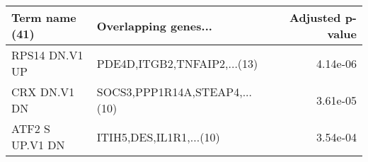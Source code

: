 \begin{tabular}{llr}
\toprule
 Term name (41) &          Overlapping genes... &  Adjusted p-value \\
\midrule
 RPS14 DN.V1 UP &   PDE4D,ITGB2,TNFAIP2,...(13) &          4.14e-06 \\
   CRX DN.V1 DN & SOCS3,PPP1R14A,STEAP4,...(10) &          3.61e-05 \\
ATF2 S UP.V1 DN &       ITIH5,DES,IL1R1,...(10) &          3.54e-04 \\
\bottomrule
\end{tabular}
